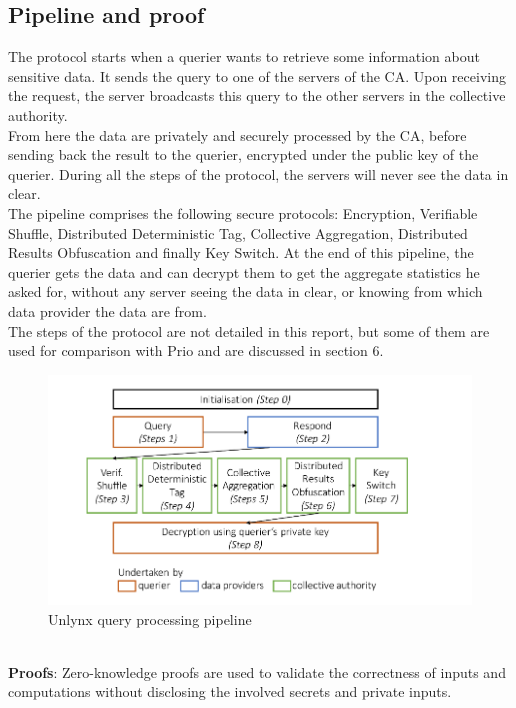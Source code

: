 \documentclass{article}
\begin{document}
\subsection{Pipeline and proof}
The protocol starts when a querier wants to retrieve some information about sensitive data. It sends the query to one of the servers of the CA. Upon receiving the request, the server broadcasts this query to the other servers in the collective authority.\\
From here the data are privately and securely processed by the CA, before sending back the result to the querier, encrypted under the public key of the querier. During all the steps of the protocol, the servers will never see the data in clear.\\
The pipeline comprises the following secure protocols: Encryption, Verifiable Shuffle, Distributed Deterministic Tag, Collective Aggregation, Distributed Results Obfuscation and finally Key Switch. At the end of this pipeline, the querier gets the data and can decrypt them to get the aggregate statistics he asked for, without any server seeing the data in clear, or knowing from which data provider the data are from.\\
The steps of the protocol are not detailed in this report, but some of them are used for comparison with Prio and are discussed in section 6.
\begin{figure}[h]
\centering
\includegraphics[scale=0.5]{img/unlynxPip.png}
\caption{Unlynx query processing pipeline}
\end{figure}
\\
\textbf{Proofs}: Zero-knowledge proofs are used to validate the correctness of inputs and computations without disclosing the involved secrets and private inputs.\\
\end{document}
